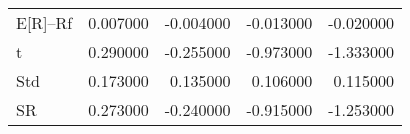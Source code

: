 \begin{tabular}{lrrrr}
\toprule
\midrule
E[R]--Rf & 0.007000 & -0.004000 & -0.013000 & -0.020000 \\
t & 0.290000 & -0.255000 & -0.973000 & -1.333000 \\
Std & 0.173000 & 0.135000 & 0.106000 & 0.115000 \\
SR & 0.273000 & -0.240000 & -0.915000 & -1.253000 \\
\bottomrule
\end{tabular}
